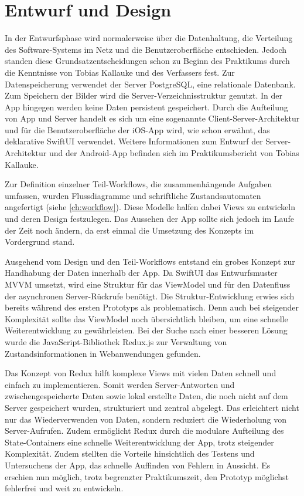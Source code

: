 \documentclass[notables, nomenclature, oneside, 150]{HSMW-Thesis}
\begin{document}
	\section{Entwurf und Design}\label{sc:entwurfunddesign}
		In der Entwurfsphase wird normalerweise über die Datenhaltung, die Verteilung des Software-Systems im Netz und die Benutzeroberfläche entschieden. Jedoch standen diese Grundsatzentscheidungen schon zu Beginn des Praktikums durch die Kenntnisse von Tobias Kallauke und des Verfassers fest. Zur Datenspeicherung verwendet der Server PostgreSQL, eine relationale Datenbank. Zum Speichern der Bilder wird die Server-Verzeichnisstruktur genutzt. In der App hingegen werden keine Daten persistent gespeichert. Durch die Aufteilung von App und Server handelt es sich um eine sogenannte Client-Server-Architektur und für die Benutzeroberfläche der iOS-App wird, wie schon erwähnt, das deklarative SwiftUI verwendet. Weitere Informationen zum Entwurf der Server-Architektur und der Android-App befinden sich im Praktikumsbericht von Tobias Kallauke.
		
		Zur Definition einzelner Teil-Workflows, die zusammenhängende Aufgaben umfassen, wurden Flussdiagramme und schriftliche Zustandsautomaten angefertigt (siehe \autoref{ch:workflow}). Diese Modelle halfen dabei Views zu entwickeln und deren Design festzulegen. Das Aussehen der App sollte sich jedoch im Laufe der Zeit noch ändern, da erst einmal die Umsetzung des Konzepts im Vordergrund stand.

		Ausgehend vom Design und den Teil-Workflows entstand ein grobes Konzept zur Handhabung der Daten innerhalb der App. Da SwiftUI das Entwurfsmuster MVVM umsetzt, wird eine Struktur für das ViewModel und für den Datenfluss der asynchronen Server-Rückrufe benötigt. Die Struktur-Entwicklung erwies sich bereits während des ersten Prototyps als problematisch. Denn auch bei steigender Komplexität sollte das ViewModel noch übersichtlich bleiben, um eine schnelle Weiterentwicklung zu gewährleisten. Bei der Suche nach einer besseren Lösung wurde die JavaScript-Bibliothek Redux.js zur Verwaltung von Zustandsinformationen in Webanwendungen gefunden.  

		Das Konzept von Redux hilft komplexe Views mit vielen Daten schnell und einfach zu implementieren. Somit werden Server-Antworten und zwischengespeicherte Daten sowie lokal erstellte Daten, die noch nicht auf dem Server gespeichert wurden, strukturiert und zentral abgelegt. Das erleichtert nicht nur das Wiederverwenden von Daten, sondern reduziert die Wiederholung von Server-Aufrufen. Zudem ermöglicht Redux durch die modulare Aufteilung des State-Containers eine schnelle Weiterentwicklung der App, trotz steigender Komplexität. Zudem stellten die Vorteile hinsichtlich des Testens und Untersuchens der App, das schnelle Auffinden von Fehlern in Aussicht. Es erschien nun möglich, trotz begrenzter Praktikumszeit, den Prototyp möglichst fehlerfrei und weit zu entwickeln.
\end{document}
